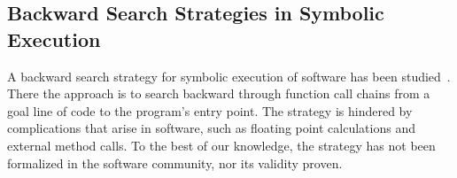 \subsection{Backward Search Strategies in Symbolic Execution}

A backward search strategy for symbolic execution of software has been
studied~\cite{ma2011directed,chandra09,dinges04,charreteur10}.  There the approach is to search
backward through function call chains from a goal line of code to the program's
entry point. The strategy is hindered by complications that arise in software,
such as floating point calculations and external method calls. To the best of our knowledge, the strategy has not been formalized
in the software community, nor its validity proven.

